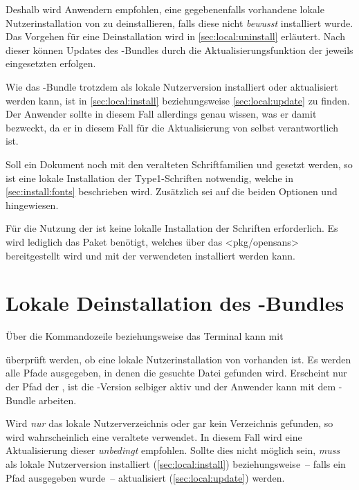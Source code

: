 Deshalb wird Anwendern empfohlen, eine gegebenenfalls vorhandene lokale 
Nutzerinstallation von \TUDScript zu deinstallieren, falls diese nicht 
\emph{bewusst} installiert wurde. Das Vorgehen für eine Deinstallation wird in 
\autoref{sec:local:uninstall} erläutert. Nach dieser können Updates des 
\TUDScript-Bundles durch die Aktualisierungsfunktion der jeweils eingesetzten 
\Distro erfolgen. 

Wie das \TUDScript-Bundle trotzdem als lokale Nutzerversion installiert oder 
aktualisiert werden kann, ist in \autoref{sec:local:install} beziehungsweise 
\autoref{sec:local:update} zu finden. Der Anwender sollte in diesem Fall 
allerdings genau wissen, was er damit bezweckt, da er in diesem Fall für die 
Aktualisierung von \TUDScript selbst verantwortlich ist.



%
Soll ein Dokument noch mit den veralteten Schriftfamilien \Univers und \DIN 
gesetzt werden, so ist eine lokale Installation der Type1-Schriften notwendig, 
welche in \autoref{sec:install:fonts} beschrieben wird. Zusätzlich sei auf die 
beiden Optionen  und  hingewiesen. 

Für die Nutzung der \OpenSans ist keine lokalle Installation der Schriften 
erforderlich. Es wird lediglich das Paket  benötigt, 
welches über das \CTAN<pkg/opensans> bereitgestellt wird und mit der 
verwendeten \Distro installiert werden kann.



\section{%
  Lokale Deinstallation des \TUDScript-Bundles%
  \label{sec:local:uninstall}%
}

Über die Kommandozeile beziehungsweise das Terminal kann mit
%
\begin{quoting}
\RET
\end{quoting}
%
überprüft werden, ob eine lokale Nutzerinstallation von \TUDScript vorhanden 
ist. Es werden alle Pfade ausgegeben, in denen die gesuchte Datei gefunden 
wird. Erscheint nur der Pfad der \Distro, ist die \TUDScript-Version selbiger 
aktiv und der Anwender kann mit dem \TUDScript-Bundle arbeiten.

Wird \emph{nur} das lokale Nutzerverzeichnis oder gar kein Verzeichnis 
gefunden, so wird wahrscheinlich eine veraltete \Distro verwendet. In diesem 
Fall wird eine Aktualisierung dieser \emph{unbedingt} empfohlen. Sollte dies 
nicht möglich sein, \emph{muss} \TUDScript als lokale Nutzerversion installiert 
(\autoref{sec:local:install}) beziehungsweise~-- falls ein Pfad ausgegeben 
wurde~-- aktualisiert (\autoref{sec:local:update}) werden.

